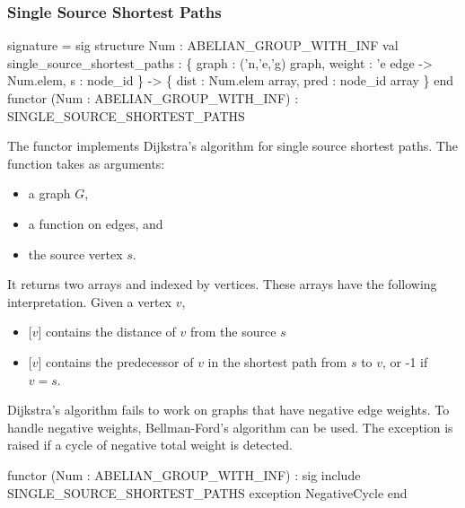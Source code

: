 \subsubsection{Single Source Shortest Paths}
\begin{SML}
 signature  = sig 
   structure Num : ABELIAN_GROUP_WITH_INF
   val single_source_shortest_paths :
                 \{ graph : ('n,'e,'g) graph,
                   weight : 'e edge -> Num.elem,
                   s : node_id
                 \} ->
                 \{ dist : Num.elem array,
                   pred :  node_id array
                 \}
 end
 functor (Num : ABELIAN_GROUP_WITH_INF) 
    : SINGLE_SOURCE_SHORTEST_PATHS
\end{SML}
The functor  implements Dijkstra's algorithm
for single source shortest paths.  The function \linebreak
{} takes as arguments: 
\begin{itemize}
\item a graph $G$, 
\item a  function on edges, and
\item the source vertex $s$.
\end{itemize}
It returns two arrays  and 
indexed by vertices.  These arrays have the following
interpretation.  Given a vertex $v$,
\begin{itemize}
\item {}[$v$] contains the distance of $v$ from the source $s$
\item {}[$v$] contains the predecessor of $v$ in the shortest
path from $s$ to $v$, or -1 if $v=s$.
\end{itemize}

Dijkstra's algorithm fails to work on graphs that have
negative edge weights.  
To handle negative weights, Bellman-Ford's algorithm can be used. 
The exception  is raised if a cycle of
negative total weight is detected.
\begin{SML}
 functor (Num : ABELIAN_GROUP_WITH_INF) : sig
    include SINGLE_SOURCE_SHORTEST_PATHS
    exception NegativeCycle
 end
\end{SML}

